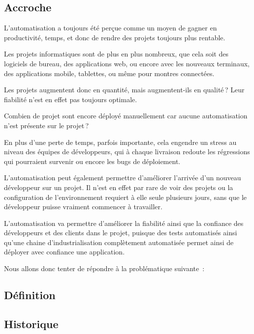 

\subsection{Accroche}
L'automatisation a toujours été perçue comme un moyen de gagner en productivité, temps, et donc de rendre des projets toujours plus rentable.
	
Les projets informatiques sont de plus en plus nombreux, que cela soit des logiciels de bureau, des applications web, ou encore avec les nouveaux terminaux, des applications mobile, tablettes, ou même pour montres connectées.
	
Les projets augmentent donc en quantité, mais augmentent-ils en qualité ? Leur fiabilité n'est en effet pas toujours optimale. 
	
Combien de projet sont encore déployé manuellement car aucune automatisation n'est présente sur le projet ? 
	
En plus d'une perte de temps, parfois importante, cela engendre un stress au niveau des équipes de développeurs, qui à chaque livraison redoute les régressions qui pourraient survenir ou encore les bugs de déploiement.

L'automatisation peut également permettre d'améliorer l'arrivée d'un nouveau développeur sur un projet. Il n'est en effet par rare de voir des projets ou la configuration de l'environnement requiert à elle seule plusieurs jours, sans que le développeur puisse vraiment commencer à travailler.
	
L'automatisation va permettre d'améliorer la fiabilité ainsi que la confiance des développeurs et des clients dans le projet, puisque des tests automatisés ainsi qu'une chaine d'industrialisation complètement automatisée permet ainsi de déployer avec confiance une application.
	
Nous allons donc tenter de répondre à la problématique suivante :
	
{\LARGE \problematique}

\subsection{Définition}

\subsection{Historique}

